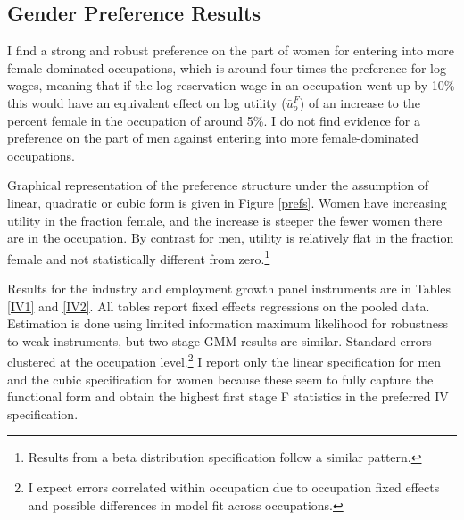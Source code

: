 \documentclass[11pt]{article}
\begin{document}



\subsection{Gender Preference Results}
I find a strong and robust preference on the part of women for entering into more female-dominated occupations, which is around four times the preference for log wages, meaning that if the log reservation wage in an occupation went up by 10\% this would have an equivalent effect on log utility ($\bar{u}^F_o$) of an increase to the percent female in the occupation of around 5\%. I do not find evidence for a preference on the part of men against entering into more female-dominated occupations.


Graphical representation of the preference structure under the assumption of linear, quadratic or cubic form is given in Figure \ref{prefs}. Women have increasing utility in the fraction female, and the increase is steeper the fewer women there are in the occupation. By contrast for men, utility is relatively flat in the fraction female and not statistically different from zero.\footnote{Results from a beta distribution specification follow a similar pattern.}

Results for the industry and employment growth panel instruments are in Tables \ref{IV1} and \ref{IV2}. All tables report fixed effects regressions on the pooled data. Estimation is done using limited information maximum likelihood for robustness to weak instruments, but two stage GMM results are similar. Standard errors clustered at the occupation level.\footnote{I expect errors correlated within occupation due to occupation fixed effects and possible differences in model fit across occupations.} I report only the linear specification for men and the cubic specification for women because these seem to fully capture the functional form and obtain the highest first stage F statistics in the preferred IV specification.
\end{document}
